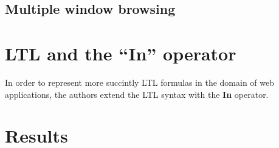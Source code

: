 \documentclass[a4paper,11pt]{article}
\begin{document}
\subsection{Multiple window browsing}
\label{multiple-window-browsing}

\section{LTL and the ``In'' operator}
\label{ltl-and-the-in-operator}

In order to represent more succintly LTL formulas in the domain of web
applications, the authors extend the LTL syntax with the \textbf{In}
operator.

\section{Results}
\label{results}

\printbibliography
\end{document}
